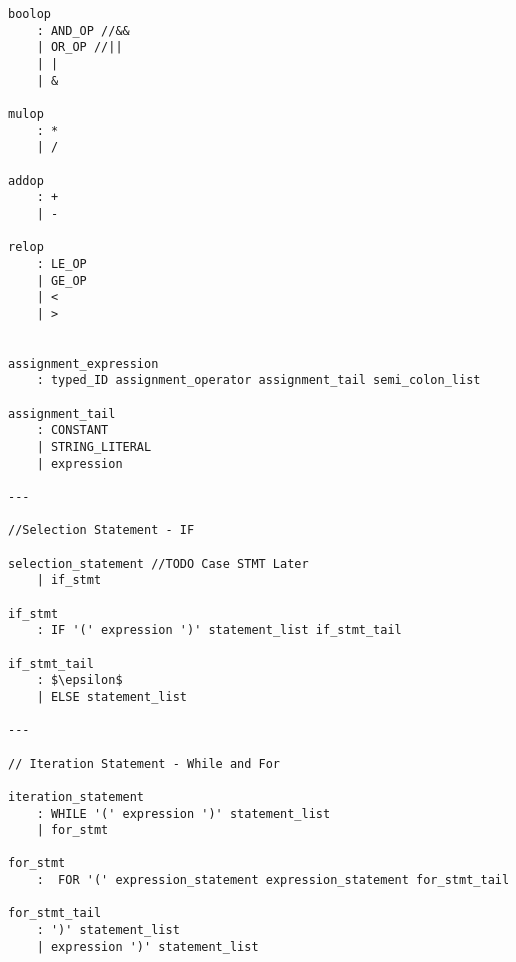 \documentclass[12pt, letterpaper]{article}
\begin{document}
\begin{lstlisting}[mathescape=true]
boolop
	: AND_OP //&&
	| OR_OP //||
	| |
	| &
	
mulop
	: *
	| /
	
addop
	: +
	| -
	
relop
	: LE_OP
	| GE_OP
	| <
	| >


assignment_expression
	: typed_ID assignment_operator assignment_tail semi_colon_list

assignment_tail
	: CONSTANT
	| STRING_LITERAL
	| expression

---

//Selection Statement - IF
	
selection_statement //TODO Case STMT Later
	| if_stmt
	
if_stmt
	: IF '(' expression ')' statement_list if_stmt_tail

if_stmt_tail
	: $\epsilon$
	| ELSE statement_list 	

---

// Iteration Statement - While and For
	
iteration_statement
	: WHILE '(' expression ')' statement_list
	| for_stmt

for_stmt
	:  FOR '(' expression_statement expression_statement for_stmt_tail
	
for_stmt_tail
	: ')' statement_list
	| expression ')' statement_list	

\end{lstlisting}







%
%
%
%
%
%	
%
%		
%		
%		
%		
%		
%
\end{document}
